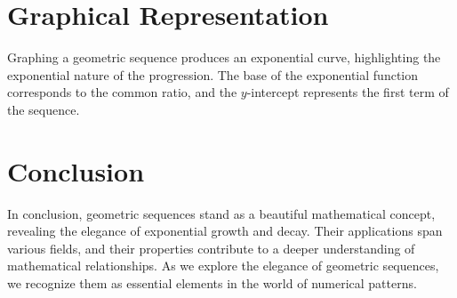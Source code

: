 \documentclass{article}
\begin{document}
\section*{Graphical Representation}
Graphing a geometric sequence produces an exponential curve, highlighting the exponential nature of the progression. The base of the exponential function corresponds to the common ratio, and the $y$-intercept represents the first term of the sequence.

\section*{Conclusion}
In conclusion, geometric sequences stand as a beautiful mathematical concept, revealing the elegance of exponential growth and decay. Their applications span various fields, and their properties contribute to a deeper understanding of mathematical relationships. As we explore the elegance of geometric sequences, we recognize them as essential elements in the world of numerical patterns.
\end{document}
